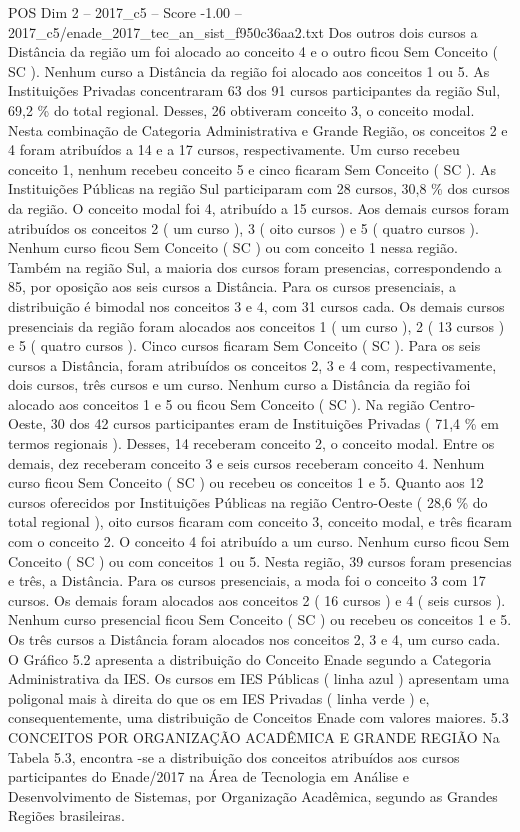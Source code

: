 \begin{textsample}{POS Dim 2 – 2017\_c5 – Score -1.00 – 2017\_c5/enade\_2017\_tec\_an\_sist\_f950c36aa2.txt}
Dos outros dois cursos a Distância da região um foi alocado ao conceito 4 e o outro ficou Sem Conceito ( SC ).
Nenhum curso a Distância da região foi alocado aos conceitos 1 ou 5.
As Instituições Privadas concentraram 63 dos 91 cursos participantes da região Sul, 69,2 \% do total regional.
Desses, 26 obtiveram conceito 3, o conceito modal.
Nesta combinação de Categoria Administrativa e Grande Região, os conceitos 2 e 4 foram atribuídos a 14 e a 17 cursos, respectivamente.
Um curso recebeu conceito 1, nenhum recebeu conceito 5 e cinco ficaram Sem Conceito ( SC ).
As Instituições Públicas na região Sul participaram com 28 cursos, 30,8 \% dos cursos da região.
O conceito modal foi 4, atribuído a 15 cursos.
Aos demais cursos foram atribuídos os conceitos 2 ( um curso ), 3 ( oito cursos ) e 5 ( quatro cursos ).
Nenhum curso ficou Sem Conceito ( SC ) ou com conceito 1 nessa região.
Também na região Sul, a maioria dos cursos foram presencias, correspondendo a 85, por oposição aos seis cursos a Distância.
Para os cursos presenciais, a distribuição é bimodal nos conceitos 3 e 4, com 31 cursos cada.
Os demais cursos presenciais da região foram alocados aos conceitos 1 ( um curso ), 2 ( 13 cursos ) e 5 ( quatro cursos ).
Cinco cursos ficaram Sem Conceito ( SC ).
Para os seis cursos a Distância, foram atribuídos os conceitos 2, 3 e 4 com, respectivamente, dois cursos, três cursos e um curso.
Nenhum curso a Distância da região foi alocado aos conceitos 1 e 5 ou ficou Sem Conceito ( SC ).
Na região Centro-Oeste, 30 dos 42 cursos participantes eram de Instituições Privadas ( 71,4 \% em termos regionais ).
Desses, 14 receberam conceito 2, o conceito modal.
Entre os demais, dez receberam conceito 3 e seis cursos receberam conceito 4.
Nenhum curso ficou Sem Conceito ( SC ) ou recebeu os conceitos 1 e 5.
Quanto aos 12 cursos oferecidos por Instituições Públicas na região Centro-Oeste ( 28,6 \% do total regional ), oito cursos ficaram com conceito 3, conceito modal, e três ficaram com o conceito 2.
O conceito 4 foi atribuído a um curso.
Nenhum curso ficou Sem Conceito ( SC ) ou com conceitos 1 ou 5.
Nesta região, 39 cursos foram presencias e três, a Distância.
Para os cursos presenciais, a moda foi o conceito 3 com 17 cursos.
Os demais foram alocados aos conceitos 2 ( 16 cursos ) e 4 ( seis cursos ).
Nenhum curso presencial ficou Sem Conceito ( SC ) ou recebeu os conceitos 1 e 5.
Os três cursos a Distância foram alocados nos conceitos 2, 3 e 4, um curso cada.
O Gráfico 5.2 apresenta a distribuição do Conceito Enade segundo a Categoria Administrativa da IES.
Os cursos em IES Públicas ( linha azul ) apresentam uma poligonal mais à direita do que os em IES Privadas ( linha verde ) e, consequentemente, uma distribuição de Conceitos Enade com valores maiores. 5.3 CONCEITOS POR ORGANIZAÇÃO ACADÊMICA E GRANDE REGIÃO Na Tabela 5.3, encontra -se a distribuição dos conceitos atribuídos aos cursos participantes do Enade/2017 na Área de Tecnologia em Análise e Desenvolvimento de Sistemas, por Organização Acadêmica, segundo as Grandes Regiões brasileiras.

\end{textsample}
